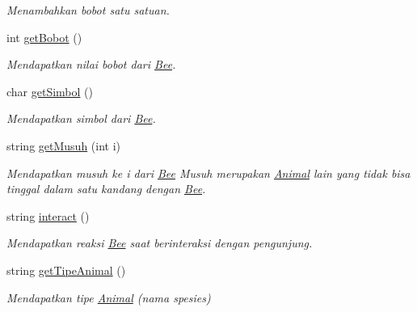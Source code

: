 \begin{DoxyCompactItemize}
\begin{DoxyCompactList}\small\item\em Menambahkan bobot satu satuan. \end{DoxyCompactList}\item 
int \hyperlink{classBee_a1040d681b2771258e6bcf12c1d4ad19c}{get\-Bobot} ()
\begin{DoxyCompactList}\small\item\em Mendapatkan nilai bobot dari \hyperlink{classBee}{Bee}. \end{DoxyCompactList}\item 
char \hyperlink{classBee_a6e28b4ca1253f48a761f8281a676ed92}{get\-Simbol} ()
\begin{DoxyCompactList}\small\item\em Mendapatkan simbol dari \hyperlink{classBee}{Bee}. \end{DoxyCompactList}\item 
string \hyperlink{classBee_a626c396ba011656c082f7623935c89c9}{get\-Musuh} (int i)
\begin{DoxyCompactList}\small\item\em Mendapatkan musuh ke i dari \hyperlink{classBee}{Bee} Musuh merupakan \hyperlink{classAnimal}{Animal} lain yang tidak bisa tinggal dalam satu kandang dengan \hyperlink{classBee}{Bee}. \end{DoxyCompactList}\item 
string \hyperlink{classBee_ad14bd3aae6bea32bb0a3aaa87d227dc4}{interact} ()
\begin{DoxyCompactList}\small\item\em Mendapatkan reaksi \hyperlink{classBee}{Bee} saat berinteraksi dengan pengunjung. \end{DoxyCompactList}\item 
string \hyperlink{classBee_a0341cf55086556e10104c7744f9fc833}{get\-Tipe\-Animal} ()
\begin{DoxyCompactList}\small\item\em Mendapatkan tipe \hyperlink{classAnimal}{Animal} (nama spesies) \end{DoxyCompactList}\end{DoxyCompactItemize}
